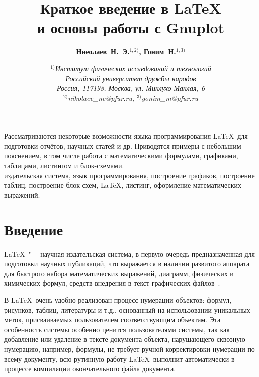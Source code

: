 ﻿\documentclass[psamsfonts, intlimits, sumlimits, namelimits, 12pt, a4paper]{article}
\begin{document}

\title{%
	\Large\bfseries
	Краткое введение в \LaTeX \\
	и основы работы с Gnuplot
}

\author{\large\bfseries Ниеолаев~Н.~Э.$^{1,2)}$,  Гоним~Н.$^{1,3)}$} %

\date{%
	\normalsize\itshape
	$^{1)}$Институт физических исследований и технологий \\
	Российский университет дружбы народов \\
	Россия, 117198, Москва, ул. Миклухо-Маклая, 6 \\[1ex]
	$^{2)}$nikolaev\_\!ne@pfur.ru, $^{3)}$gonim\_\!m@pfur.ru
}

\maketitle


{\small\indent Рассматриваются некоторые возможности языка программирования \LaTeX\ для подготовки отчётов, научных статей и др. Приводятся примеры с небольшим пояснением, в том числе работа с математическими формулами, графиками, таблицами, листингом и блок\nobreak-схемами.
}\\[1ex]

 издательская система, язык программирования, построение графиков, построение таблиц, построение блок\nobreak-схем, \LaTeX, листинг, оформление математических выражений.



\section{Введение}
\label{sec:introduction}


\LaTeX\ "--- научная издательская система, в первую очередь предназначенная для подготовки научных публикаций, что выражается в наличии развитого аппарата для быстрого набора математических выражений, диаграмм, физических и химических формул, средств внедрения в текст графических файлов~\cite{nasyrov:book:2019:01}.

В \LaTeX\ очень удобно реализован процесс нумерации объектов: формул, рисунков, таблиц, литературы и т.д., основанный на использовании уникальных меток, присваиваемых пользователем соответствующим объектам. Эта особенность системы особенно ценится пользователями системы, так как добавление или удаление в тексте документа объекта, нарушающего сквозную нумерацию, например, формулы, не требует ручной корректировки нумерации по всему документу, всю рутинную работу \LaTeX\ выполнит автоматически в процессе компиляции окончательного файла документа.
\end{document}
